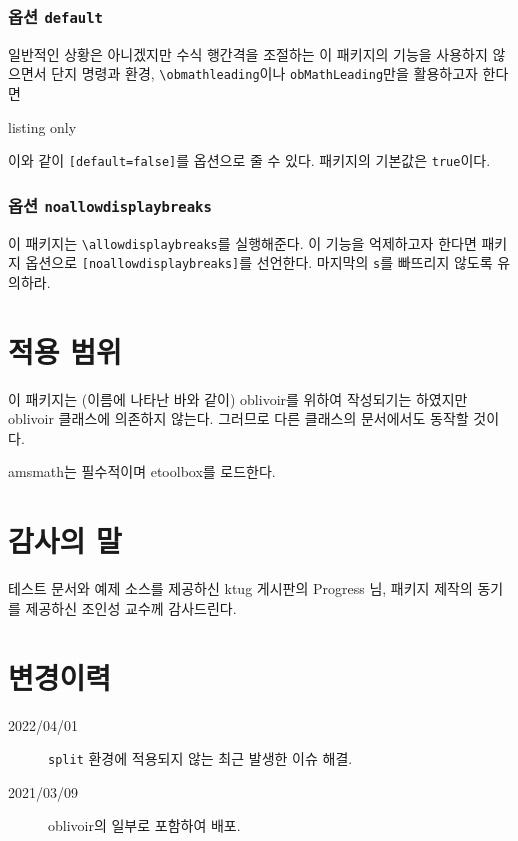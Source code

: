 \documentclass[a4paper,amsmath]{oblivoir}
\newcommand\pkg[1]{\textsf{#1}}
\begin{document}
\subsubsection{옵션 \texttt{default}}

일반적인 상황은 아니겠지만 수식 행간격을 조절하는 이 패키지의 기능을 사용하지 않으면서 단지 명령과 환경, \verb|\obmathleading|이나
\verb|obMathLeading|만을 활용하고자 한다면 
\begin{tcblisting}{listing only}
    \usepackage[default=false]{ob-mathleading}
\end{tcblisting}
이와 같이 \verb|[default=false]|를 옵션으로 줄 수 있다. 패키지의 기본값은 \verb|true|이다.

\subsubsection{옵션 \texttt{noallowdisplaybreaks}}

이 패키지는 \verb|\allowdisplaybreaks|를 실행해준다. 이 기능을 억제하고자 한다면
패키지 옵션으로 \verb|[noallowdisplaybreaks]|를 선언한다. 마지막의 \verb|s|를 빠뜨리지 않도록
유의하라.

\section{적용 범위}

이 패키지는 (이름에 나타난 바와 같이) \pkg{oblivoir}를 위하여 작성되기는 하였지만 \pkg{oblivoir} 클래스에
의존하지 않는다. 그러므로 다른 클래스의 문서에서도 동작할 것이다.

\pkg{amsmath}는 필수적이며 \pkg{etoolbox}를 로드한다.

\section{감사의 말}

테스트 문서와 예제 소스를 제공하신 ktug 게시판의 Progress 님, 패키지 제작의 동기를 제공하신 조인성 교수께 감사드린다.

\section{변경이력}

\begin{description}
\item [2022/04/01] \texttt{split} 환경에 적용되지 않는 최근 발생한 이슈 해결.
\item [2021/03/09] oblivoir의 일부로 포함하여 배포.
\end{description}
\end{document}
